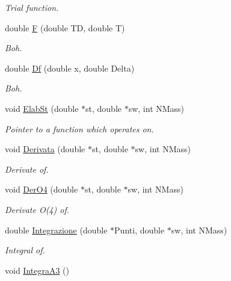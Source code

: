 \begin{DoxyCompactItemize}
\begin{DoxyCompactList}\small\item\em \-Trial function. \end{DoxyCompactList}\item 
\hypertarget{classMatematica_a033b6eb7c18cac84239173ca4f210fed}{double \hyperlink{classMatematica_a033b6eb7c18cac84239173ca4f210fed}{\-F} (double \-T\-D, double \-T)}\label{classMatematica_a033b6eb7c18cac84239173ca4f210fed}

\begin{DoxyCompactList}\small\item\em \-Boh. \end{DoxyCompactList}\item 
\hypertarget{classMatematica_ad572ab06bc7d7c29e3f1043541f69da8}{double \hyperlink{classMatematica_ad572ab06bc7d7c29e3f1043541f69da8}{\-Df} (double x, double \-Delta)}\label{classMatematica_ad572ab06bc7d7c29e3f1043541f69da8}

\begin{DoxyCompactList}\small\item\em \-Boh. \end{DoxyCompactList}\item 
void \hyperlink{classMatematica_aef286a585b6e7d30107ba8f36032e3ad}{\-Elab\-St} (double $\ast$st, double $\ast$sw, int \-N\-Mass)
\begin{DoxyCompactList}\small\item\em \-Pointer to a function which operates on. \end{DoxyCompactList}\item 
void \hyperlink{classMatematica_a6393bbfadafe6c13c2e94b79c7764d4b}{\-Derivata} (double $\ast$st, double $\ast$sw, int \-N\-Mass)
\begin{DoxyCompactList}\small\item\em \-Derivate of. \end{DoxyCompactList}\item 
void \hyperlink{classMatematica_a0ffa5ec4ebf021c7e8b2e79bed9524e1}{\-Der\-O4} (double $\ast$st, double $\ast$sw, int \-N\-Mass)
\begin{DoxyCompactList}\small\item\em \-Derivate \-O(4) of. \end{DoxyCompactList}\item 
double \hyperlink{classMatematica_a7f6e9a0a72348c10d08e388e75978d25}{\-Integrazione} (double $\ast$\-Punti, double $\ast$sw, int \-N\-Mass)
\begin{DoxyCompactList}\small\item\em \-Integral of. \end{DoxyCompactList}\item 
\hypertarget{classMatematica_aa6998b41af5fad626bb70cc6fac6410e}{void \hyperlink{classMatematica_aa6998b41af5fad626bb70cc6fac6410e}{\-Integra\-A3} ()}\label{classMatematica_aa6998b41af5fad626bb70cc6fac6410e}


\end{DoxyCompactItemize}
